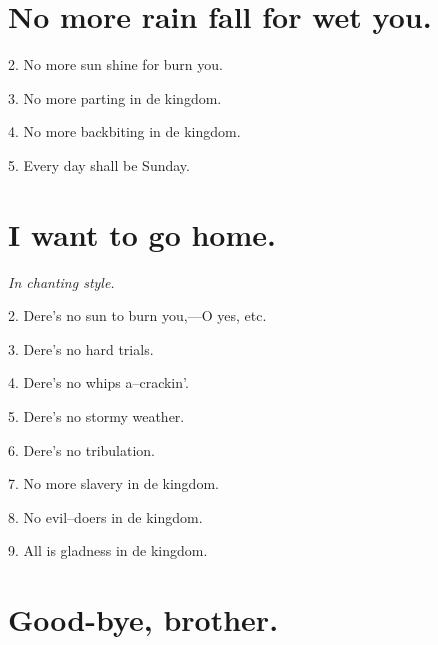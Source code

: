 \documentclass[a5paper,10pt]{book}
\begin{document}
\newpage
\section{No more rain fall for wet you.}
\thispagestyle{empty}

\begin{song}
\end{song}

\begin{stanza}
\item[2.]
  No more sun shine for burn you.
\item[3.]
  No more parting in de kingdom.
\item[4.]
  No more backbiting in de kingdom.
\item[5.]
  Every day shall be Sunday.
\end{stanza}


\newpage
\section{I want to go home.}
\thispagestyle{empty}

\emph{In chanting style.}

\begin{song}
\end{song}

\begin{stanza}
\item[2.]
  Dere's no sun to burn you,---O yes, etc.
\item[3.]
  Dere's no hard trials.
\item[4.]
  Dere's no whips a--crackin'.
\item[5.]
  Dere's no stormy weather.
\item[6.]
  Dere's no tribulation.
\item[7.]
  No more slavery in de kingdom.
\item[8.]
  No evil--doers in de kingdom.
\item[9.]
  All is gladness in de kingdom.
\end{stanza}


\newpage
\section{Good-bye, brother.}
\thispagestyle{empty}

\begin{song}
\end{song}
\end{document}
